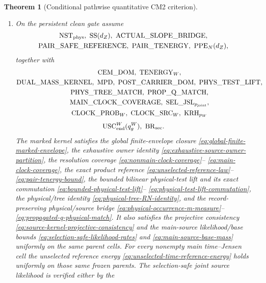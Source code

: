 \documentclass[11pt]{article}
\newtheorem{theorem}{Theorem}[section]
\begin{document}
\begin{theorem}[Conditional pathwise quantitative CM2 criterion]
\begin{enumerate}[label=\textup{(H\arabic*)}]
      the signed multiplier bridge;
\item On the persistent clean gate assume
      \[
      \begin{gathered}
       \mathrm{NST}_{\rm phys},\ \mathrm{SS}(d_Z),\
       \mathrm{ACTUAL\_SLOPE\_BRIDGE},\\
       \mathrm{PAIR\_SAFE\_REFERENCE},\ \mathrm{PAIR\_TENERGY},\
       \mathrm{PPE}_{N}(d_Z),
      \end{gathered}
      \]
      together with
      \[
       \begin{gathered}
       \mathrm{CEM\_DOM},\ \mathrm{TENERGY}_{W},\\
       \mathrm{DUAL\_MASS\_KERNEL},\ \mathrm{MPD},\
       \mathrm{POST\_CARRIER\_DOM},\ \mathrm{PHYS\_TEST\_LIFT},\\
       \mathrm{PHYS\_TREE\_MATCH},\ \mathrm{PROP\_Q\_MATCH},\\
       \mathrm{MAIN\_CLOCK\_COVERAGE},\
       \mathrm{SEL\_JSL}_{p_{\rm joint}},\\
       \mathrm{CLOCK\_PROB}_{W},\ \mathrm{CLOCK\_SRC}_{W},\
       \mathrm{KRH}_{p_W}
       \end{gathered}
      \]
      \[
       \mathrm{USC}_{\rm end}^{W}(q_g^W),\ \mathrm{BR}_{\rm sec}.
      \]
      The marked kernel satisfies the global finite-envelope closure
      \eqref{eq:global-finite-marked-envelope}, the exhaustive owner identity
      \eqref{eq:exhaustive-source-owner-partition}, the resolution coverage
      \eqref{eq:nonmain-clock-coverage}--
      \eqref{eq:main-clock-coverage}, the exact product reference
      \eqref{eq:unselected-reference-law}--\eqref{eq:pair-tenergy-bound},
      the bounded bilinear physical-test lift and its exact commutation
      \eqref{eq:bounded-physical-test-lift}--
      \eqref{eq:physical-test-lift-commutation}, the physical/tree identity
      \eqref{eq:physical-tree-RN-identity}, and the record-preserving
      physical/source bridge
      \eqref{eq:physical-occurrence-m-measure}--
      \eqref{eq:propagated-q-physical-match}.  It also satisfies the
      projective consistency
      \eqref{eq:source-kernel-projective-consistency} and the main-source
      likelihood/base
      bounds \eqref{eq:selection-safe-likelihood-rates} and
      \eqref{eq:main-source-base-mass} uniformly on the same parent cells.
      For every nonempty main time--Jensen cell the unselected reference
      energy \eqref{eq:unselected-time-reference-energy} holds uniformly on
      those same frozen parents.
      The selection-safe joint source likelihood is verified either by the

\end{enumerate}
\end{theorem}
\end{document}
